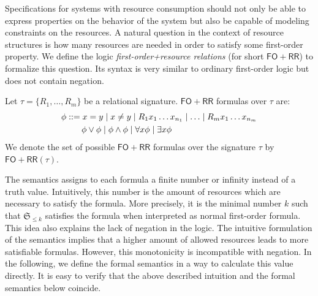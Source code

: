 \documentclass{LMCS}
\newcommand{\structureS}{\mathfrak S}
\newcommand{\FORR}{\ensuremath{\mathsf{FO\!\!+\!\!RR}}}
\begin{document}
Specifications for systems with resource consumption should not only be able to
express properties on the behavior of the system but also be capable of modeling
constraints on the resources. A natural question in the context of resource
structures is how many resources are needed in order to satisfy some first-order
property. We define the logic \emph{first-order+resource relations} (for short
\FORR{}) to formalize this question. Its syntax is very similar to ordinary
first-order logic but does not contain negation.

\begin{defi}[Syntax of \FORR{}]
  Let $\tau = \{R_1,\ldots,R_m\}$ be a  relational signature. \FORR{} formulas
  over $\tau$ are:
  \begin{align*}
  \phi &::= x = y \mid x \ne y \mid R_1x_1\ldots x_{n_1} \mid \ldots \mid R_mx_1\ldots
x_{n_m} \\
   &\hphantom{::= }\;\, \phi \vee \phi \mid \phi \wedge \phi \mid \forall x\phi
\mid \exists x \phi 
  \end{align*}
  We denote the set of possible \FORR{} formulas over the signature $\tau$ by
$\FORR(\tau)$.
\end{defi}

The semantics assigns to each formula a finite number or infinity instead of a
truth value. Intuitively, this number is the amount of resources which are
necessary to satisfy the formula. More precisely, it is the minimal number $k$
such that $\structureS_{\le k}$ satisfies the formula when interpreted as normal
first-order formula. This idea also explains the lack of negation in the logic.
The intuitive formulation of the semantics implies that a higher amount of
allowed resources leads to more satisfiable formulas. However, this monotonicity
is incompatible with negation. In the following, we define the formal semantics
in a way to calculate this value directly. It is easy to verify that the above
described intuition and the formal semantics below coincide. 
\end{document}
